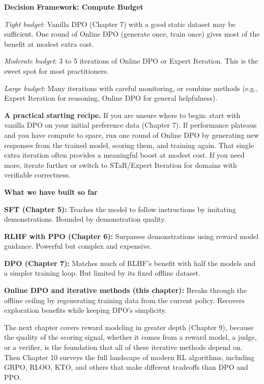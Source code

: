 \begin{chapterenv}
\begin{infobox}
\textbf{Decision Framework: Compute Budget}

\textit{Tight budget}: Vanilla DPO (Chapter 7) with a good static dataset may be sufficient. One round of Online DPO (generate once, train once) gives most of the benefit at modest extra cost.

\textit{Moderate budget}: 3 to 5 iterations of Online DPO or Expert Iteration. This is the sweet spot for most practitioners.

\textit{Large budget}: Many iterations with careful monitoring, or combine methods (e.g., Expert Iteration for reasoning, Online DPO for general helpfulness).
\end{infobox}

\textbf{A practical starting recipe.} If you are unsure where to begin: start with vanilla DPO on your initial preference data (Chapter 7). If performance plateaus and you have compute to spare, run one round of Online DPO by generating new responses from the trained model, scoring them, and training again. That single extra iteration often provides a meaningful boost at modest cost. If you need more, iterate further or switch to STaR/Expert Iteration for domains with verifiable correctness.

\begin{infobox}
\textbf{What we have built so far}

\textbf{SFT (Chapter 5):} Teaches the model to follow instructions by imitating demonstrations. Bounded by demonstration quality.

\textbf{RLHF with PPO (Chapter 6):} Surpasses demonstrations using reward model guidance. Powerful but complex and expensive.

\textbf{DPO (Chapter 7):} Matches much of RLHF's benefit with half the models and a simpler training loop. But limited by its fixed offline dataset.

\textbf{Online DPO and iterative methods (this chapter):} Breaks through the offline ceiling by regenerating training data from the current policy. Recovers exploration benefits while keeping DPO's simplicity.

The next chapter covers reward modeling in greater depth (Chapter 9), because the quality of the scoring signal, whether it comes from a reward model, a judge, or a verifier, is the foundation that all of these iterative methods depend on. Then Chapter 10 surveys the full landscape of modern RL algorithms, including GRPO, RLOO, KTO, and others that make different tradeoffs than DPO and PPO.
\end{infobox}

\end{chapterenv}